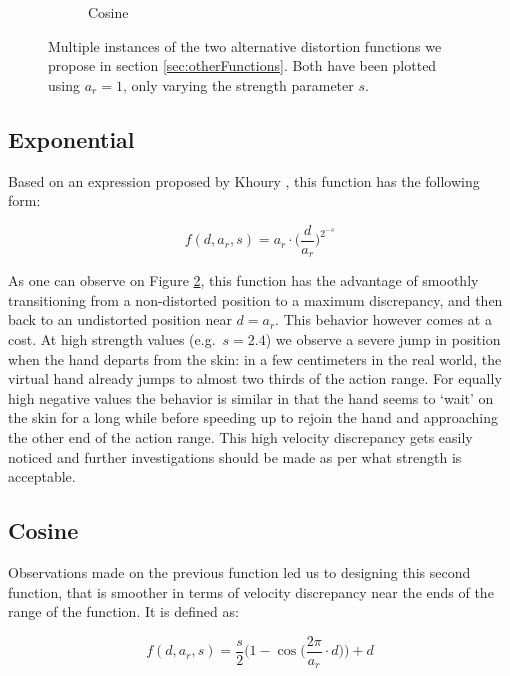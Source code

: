\begin{figure}[h]
\begin{subfigure}[b]{.45\textwidth}
        \caption{Cosine}
        \label{fig:otherDistortionsCos}
    \end{subfigure}
    \caption{Multiple instances of the two alternative distortion functions we propose in section \ref{sec:otherFunctions}. Both have been plotted using $a_r = 1$, only varying the strength parameter $s$.}
    \label{fig:otherDistortions}
\end{figure}

\subsection*{Exponential}

Based on an expression proposed by Khoury \cite{khoury2015human}, this function has the following form:

\begin{equation*}
    f(d, a_r, s) = a_r \cdot \Bigg(\frac{d}{a_r}\Bigg)^{2^{-s}}
\end{equation*}

As one can observe on Figure \ref{fig:otherDistortions}, this function has the advantage of smoothly transitioning from a non-distorted position to a maximum discrepancy, and then back to an undistorted position near $d=a_r$. This behavior however comes at a cost. At high strength values (e.g.\ $s=2.4$) we observe a severe jump in position when the hand departs from the skin: in a few centimeters in the real world, the virtual hand already jumps to almost two thirds of the action range. For equally high negative values the behavior is similar in that the hand seems to `wait' on the skin for a long while before speeding up to rejoin the hand and approaching the other end of the action range. This high velocity discrepancy gets easily noticed and further investigations should be made as per what strength is acceptable.

\subsection*{Cosine}

Observations made on the previous function led us to designing this second function, that is smoother in terms of velocity discrepancy near the ends of the range of the function. It is defined as:

\begin{equation*}
    f(d, a_r, s) = \frac{s}{2}\Bigg(1 - \cos\Big(\frac{2\pi}{a_r} \cdot d\Big)\Bigg) + d
\end{equation*}

